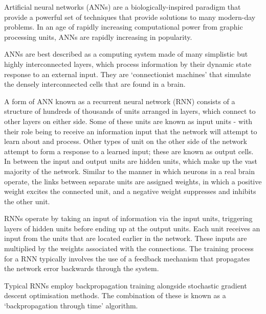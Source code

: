 
Artificial neural networks (ANNs) are a biologically-inspired paradigm that provide a powerful set of techniques that provide solutions to many modern-day problems. In an age of rapidly increasing computational power from graphic processing units, ANNs are rapidly increasing in popularity.

ANNs are best described as a computing system made of many simplistic but highly interconnected layers, which process information by their dynamic state response to an external input. They are `connectionist machines' that simulate the densely interconnected cells that are found in a brain.

A form of ANN known as a recurrent neural network (RNN) consists of a structure of hundreds of thousands of units arranged in layers, which connect to other layers on either side. Some of these units are known as input units - with their role being to receive an information input that the network will attempt to learn about and process. Other types of unit on the other side of the network attempt to form a response to a learned input; these are known as output cells. In between the input and output units are hidden units, which make up the vast majority of the network. Similar to the manner in which neurons in a real brain operate, the links between separate units are assigned weights, in which a positive weight excites the connected unit, and a negative weight suppresses and inhibits the other unit.

RNNs operate by taking an input of information via the input units, triggering layers of hidden units before ending up at the output units. Each unit receives an input from the units that are located earlier in the network. These inputs are multiplied by the weights associated with the connections. The training process for a RNN typically involves the use of a feedback mechanism that propagates the network error backwards through the system.


Typical RNNs employ backpropagation training alongside stochastic gradient descent optimisation methods. The combination of these is known as a `backpropagation through time' algorithm. 

